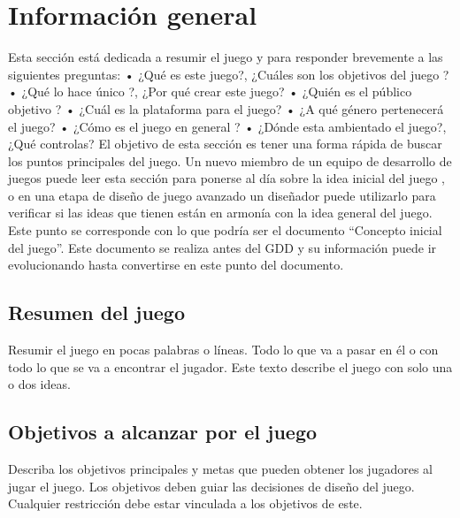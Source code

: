 
\pagestyle{fancy}
\fancyhead[LE,RO]{\thepage}
\fancyhead[LO]{\nouppercase{\rightmark}}

\label{sec:apendice:GDD}


\minitoc

\section{Información general}

Esta sección está dedicada a resumir el juego y para responder brevemente a las siguientes preguntas: 
•	¿Qué es este juego?, ¿Cuáles son los objetivos del juego ? 
•	¿Qué lo hace único ?, ¿Por qué crear este juego?
•	¿Quién es el público objetivo ?
•	¿Cuál es la plataforma para el juego? 
•	¿A qué género pertenecerá el juego? 
•	¿Cómo es el juego en general ? 
•	¿Dónde esta ambientado el juego?, ¿Qué controlas?
El objetivo de esta sección es tener una forma rápida de buscar los puntos principales del juego. Un nuevo miembro de un equipo de desarrollo de juegos puede leer esta sección para ponerse al día sobre la idea inicial del juego , o en una etapa de diseño de juego avanzado un diseñador puede utilizarlo para verificar si las ideas que tienen están en armonía con la idea general del juego. 
Este punto se corresponde con lo que podría ser el documento “Concepto inicial del juego”. Este documento se realiza antes del GDD y su información puede ir evolucionando hasta convertirse en este punto del documento.


\subsection{Resumen del juego}

Resumir el juego en pocas palabras o líneas. Todo lo que va a pasar en él o con todo lo que se va a encontrar el jugador. Este texto describe el juego con solo una o dos ideas.

\subsection{Objetivos a alcanzar por el juego}
Describa los objetivos principales y metas que pueden obtener los jugadores al jugar el juego. Los objetivos deben guiar las decisiones de diseño del juego. Cualquier restricción debe estar vinculada a los objetivos de este.



